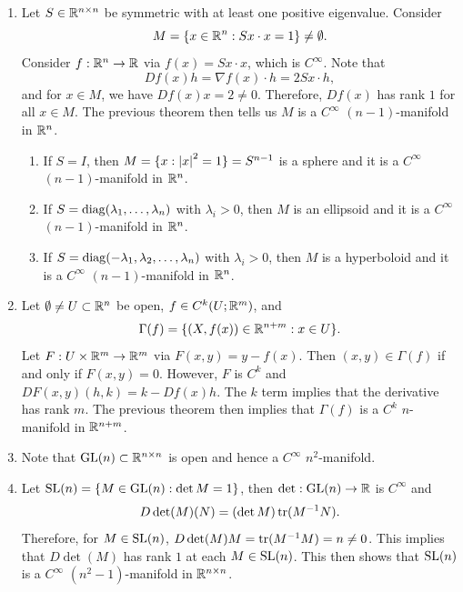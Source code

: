 \documentclass[a4paper]{article}
\begin{document}
\begin{eg}
\begin{enumerate}
\item Let $S \in \mathbb{R}^{n \times n}$ be symmetric with at least
one positive eigenvalue. Consider
\[
M = \{x \in \mathbb{R}^n :
S x \cdot x = 1\} \neq \emptyset.
\]
Consider $f : \mathbb{R}^n \to \mathbb{R}$ via $f(x) = Sx \cdot x$,
which is $C^\infty$. Note that
\[
Df(x) h = \nabla f(x) \cdot h = 2Sx \cdot h,
\]
and for $x \in M$, we have $Df(x) x = 2 \neq 0$.
Therefore, $Df(x)$ has rank $1$ for all $x \in M$.
The previous theorem then tells us $M$ is a $C^\infty$
$(n-1)$-manifold in $\mathbb{R}^n$.

\begin{enumerate}
  \item If $S = I$, then
  $M = \{x : \left\lvert x\right\rvert^2 = 1\} = S^{n-1}$ is a sphere and
  it is a $C^\infty$ $(n-1)$-manifold in $\mathbb{R}^n$.

  \item If $S = \operatorname{diag}(\lambda_1, \dots, \lambda_n)$
  with $\lambda_i > 0$, then $M$ is an ellipsoid
  and it is a $C^\infty$ $(n-1)$-manifold in $\mathbb{R}^n$.

  \item If $S = \operatorname{diag}(-\lambda_1, \lambda_2, \dots, \lambda_n)$
  with $\lambda_i > 0$, then $M$ is a hyperboloid and it
  is a $C^\infty$ $(n-1)$-manifold in $\mathbb{R}^n$.
\end{enumerate}

\item Let $\emptyset \neq U \subset \mathbb{R}^n$ be open,
$f \in C^k(U; \mathbb{R}^m)$, and
\[
\Gamma(f) = \{(X, f(x)) \in \mathbb{R}^{n+m} : x \in U\}.
\]
Let $F : U \times \mathbb{R}^m \to \mathbb{R}^m$ via $F(x, y) = y - f(x)$.
Then $(x, y) \in \Gamma(f)$ if and only if $F(x, y) = 0$.
However, $F$ is $C^k$ and $DF(x, y) (h, k) = k - Df(x) h$.
The $k$ term implies that the derivative has rank $m$.
The previous theorem then implies that $\Gamma(f)$ is
a $C^k$ $n$-manifold in $\mathbb{R}^{n+m}$.

\item Note that $\mathrm{GL}(n) \subset \mathbb{R}^{n \times n}$ is open
and hence a $C^\infty$ $n^2$-manifold.

\item Let $\mathrm{SL}(n) = \{M \in \mathrm{GL}(n) : \det M = 1\}$,
then $\det: \mathrm{GL}(n) \to \mathbb{R}$ is $C^\infty$ and
\[
D \det(M) (N) = (\det M) \operatorname{tr}(M^{-1} N).
\]
Therefore, for $M \in \mathrm{SL}(n)$, $D \det(M) M = \operatorname{tr}(M^{-1}
M) = n \neq 0$. This implies that $D \det(M)$ has rank
$1$ at each $M \in \mathrm{SL}(n)$. This then shows that
$\mathrm{SL}(n)$ is a $C^\infty$ $(n^2 - 1)$-manifold in $\mathbb{R}^{n \times n}$.


\end{enumerate}
\end{eg}
\end{document}
